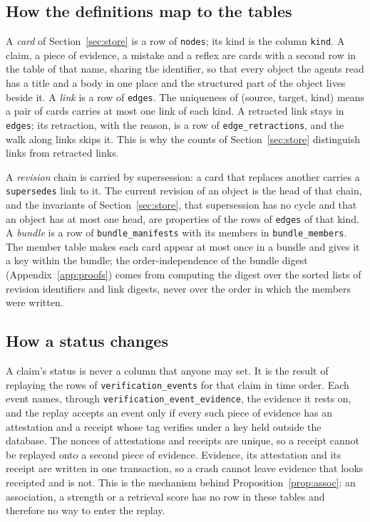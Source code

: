 \subsection{How the definitions map to the tables}
A \emph{card} of Section~\ref{sec:store} is a row of \texttt{nodes}; its kind is the column \texttt{kind}. A claim, a piece of evidence, a mistake and a reflex are cards with a second row in the table of that name, sharing the identifier, so that every object the agents read has a title and a body in one place and the structured part of the object lives beside it. A \emph{link} is a row of \texttt{edges}. The uniqueness of (source, target, kind) means a pair of cards carries at most one link of each kind. A retracted link stays in \texttt{edges}; its retraction, with the reason, is a row of \texttt{edge\_retractions}, and the walk along links skips it. This is why the counts of Section~\ref{sec:store} distinguish links from retracted links.

A \emph{revision} chain is carried by supersession: a card that replaces another carries a \texttt{supersedes} link to it. The current revision of an object is the head of that chain, and the invariants of Section~\ref{sec:store}, that supersession has no cycle and that an object has at most one head, are properties of the rows of \texttt{edges} of that kind. A \emph{bundle} is a row of \texttt{bundle\_manifests} with its members in \texttt{bundle\_members}. The member table makes each card appear at most once in a bundle and gives it a key within the bundle; the order-independence of the bundle digest (Appendix~\ref{app:proofs}) comes from computing the digest over the sorted lists of revision identifiers and link digests, never over the order in which the members were written.

\subsection{How a status changes}
A claim's status is never a column that anyone may set. It is the result of replaying the rows of \texttt{verification\_events} for that claim in time order. Each event names, through \texttt{verification\_event\_evidence}, the evidence it rests on, and the replay accepts an event only if every such piece of evidence has an attestation and a receipt whose tag verifies under a key held outside the database. The nonces of attestations and receipts are unique, so a receipt cannot be replayed onto a second piece of evidence. Evidence, its attestation and its receipt are written in one transaction, so a crash cannot leave evidence that looks receipted and is not. This is the mechanism behind Proposition~\ref{prop:assoc}: an association, a strength or a retrieval score has no row in these tables and therefore no way to enter the replay.

